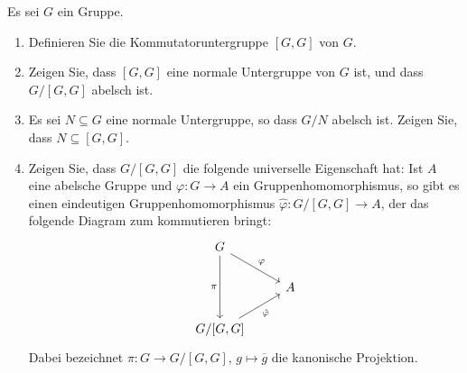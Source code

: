 \begin{question}
  Es sei $G$ ein Gruppe.
  \begin{enumerate}
    \item
      Definieren Sie die Kommutatoruntergruppe $[G,G]$ von $G$.
    \item
      Zeigen Sie, dass $[G,G]$ eine normale Untergruppe von $G$ ist, und dass $G/[G,G]$ abelsch ist.
    \item
      Es sei $N \subseteq G$ eine normale Untergruppe, so dass $G/N$ abelsch ist.
      Zeigen Sie, dass $N \subseteq [G,G]$.
    \item
      Zeigen Sie, dass $G/[G,G]$ die folgende universelle Eigenschaft hat:
      Ist $A$ eine abelsche Gruppe und $\varphi \colon G \to A$ ein Gruppenhomomorphismus, so gibt es einen eindeutigen Gruppenhomomorphismus $\hat{\varphi} \colon G/[G,G] \to A$, der das folgende Diagram zum kommutieren bringt:
      \[
        \begin{tikzcd}[ampersand replacement = \&]
              G
              \arrow{dr}{\varphi}
              \arrow[swap]{dd}{\pi}
          \&  {}
          \\
              {}
          \&  A
          \\
              G/[G,G]
              \arrow[swap]{ru}{\hat{\varphi}}
          \&  {}
        \end{tikzcd}
      \]
      Dabei bezeichnet $\pi \colon G \to G/[G,G]$, $g \mapsto \overline{g}$ die kanonische Projektion.
  \end{enumerate}
\end{question}




